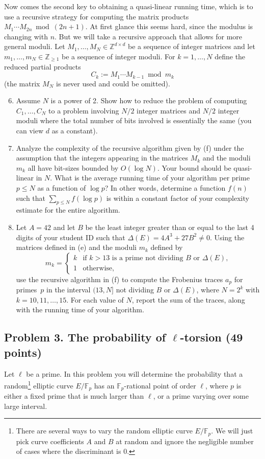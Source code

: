 \documentclass[11pt]{article}
\newcommand{\Fp}{\mathbb{F}_p}
\newcommand{\Z}{\mathbb{Z}}
\begin{document}
Now comes the second key to obtaining a quasi-linear running time, which is to use a recursive strategy for computing the matrix products $M_1\cdots M_{2n}\bmod (2n+1)$.  At first glance this seems hard, since the modulus is changing with $n$.  But we will take a recursive approach that allows for more general moduli.
Let $M_1,\ldots,M_N\in \Z^{d\times d}$ be a sequence of integer matrices and let $m_1,\ldots,m_N\in \Z_{\ge 1}$ be a sequence of integer moduli.
For $k=1,\ldots,N$ define the reduced partial products
\[
C_k:=M_1\cdots M_{k-1}\bmod m_k
\]
(the matrix $M_N$ is never used and could be omitted).
\begin{enumerate}[{\bf (a)}]
\setcounter{enumi}{5}
\item Assume $N$ is a power of 2.  Show how to reduce the problem of computing $C_1,\ldots,C_N$ to a problem involving $N/2$ integer matrices and $N/2$ integer moduli where the total number of bits involved is essentially the same (you can view $d$ as a constant).
\item Analyze the complexity of the recursive algorithm given by (f) under the assumption that the integers appearing in the matrices $M_k$ and the moduli $m_k$ all have bit-sizes bounded by $O(\log N)$.  Your bound should be quasi-linear in $N$.  What is the average running time of your algorithm per prime $p\le N$ as a function of $\log p$?
In other words, determine a function $f(n)$ such that $\sum_{p\le N} f(\log p)$ is within a constant factor of your complexity estimate for the entire algorithm.

\item Let $A=42$ and let $B$ be the least integer greater than or equal to the last 4 digits of your student ID such that $\Delta(E)=4A^3+27B^2\ne 0$.  Using the matrices defined in (e) and the moduli $m_k$ defined by
\[
m_k = \begin{cases}
k &\text{if $k>13$ is a prime not dividing $B$ or $\Delta(E)$},\\
1 &\text{otherwise},
\end{cases}
\]
use the recursive algorithm in (f) to compute the Frobenius traces $a_p$ for primes~$p$ in the interval $(13,N]$ not dividing $B$ or $\Delta(E)$, where $N=2^{k}$ with $k=10,11,\ldots,15$.
For each value of $N$, report the sum of the traces, along with the running time of your algorithm.
\end{enumerate}


\subsection*{Problem 3. The probability of $\ell$-torsion (49 points)}
Let $\ell$ be a prime.
In this problem you will determine the probability that a random\footnote{There are several ways to vary the random elliptic curve $E/\Fp$.  We will just pick curve coefficients $A$ and $B$ at random and ignore the negligible number of cases where the discriminant is 0.} elliptic curve $E/\Fp$ has an $\Fp$-rational point of order $\ell$, where $p$ is either a fixed prime that is much larger than $\ell$, or a prime varying over some large interval.
\end{document}
